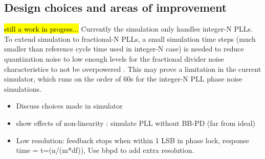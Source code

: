 \subsection{Design choices and areas of improvement}
\hl{still a work in progess...}
Currently the simulation only handles integer-N PLLs. To extend simulation to fractional-N PLLs, a small simulation time steps (much smaller than reference cycle time used in integer-N case) is needed to reduce quantization noise to low enough levels for the fractional divider noise characteristics to not be overpowered \cite{perrott_2002_sim}. This may prove a limitation in the current simulator, which runs on the order of 60s for the integer-N PLL phase noise simulations.



\begin{itemize}
	\item Discuss choices made in simulator

	\item show effects of non-linearity : simulate PLL without BB-PD (far from ideal)

	\item Low resolution: feedback stops when within 1 LSB in phase lock, response time = t=(n/(m*df)), Use bbpd to add extra resolution.


\end{itemize}
